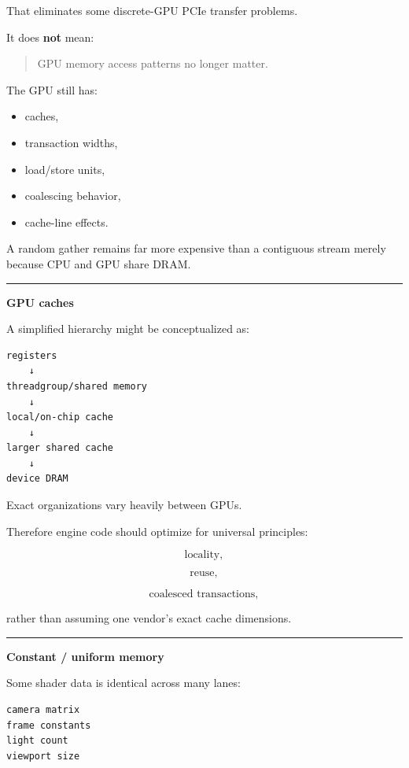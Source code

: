 That eliminates some discrete-GPU PCIe transfer problems.

It does \textbf{not} mean:

\begin{quote}
GPU memory access patterns no longer matter.
\end{quote}

The GPU still has:

\begin{itemize}
\tightlist
\item
  caches,
\item
  transaction widths,
\item
  load/store units,
\item
  coalescing behavior,
\item
  cache-line effects.
\end{itemize}

A random gather remains far more expensive than a contiguous stream merely because CPU and GPU share DRAM.

\begin{center}\rule{0.5\linewidth}{0.5pt}\end{center}

\textbf{GPU caches}

A simplified hierarchy might be conceptualized as:

\protect{}\label{q2nq6h}%
\begin{verbatim}
registers
    ↓
threadgroup/shared memory
    ↓
local/on-chip cache
    ↓
larger shared cache
    ↓
device DRAM
\end{verbatim}

Exact organizations vary heavily between GPUs.

Therefore engine code should optimize for universal principles:

\[
\text{locality},
\]

\[
\text{reuse},
\]

\[
\text{coalesced transactions},
\]

rather than assuming one vendor's exact cache dimensions.

\begin{center}\rule{0.5\linewidth}{0.5pt}\end{center}

\textbf{Constant / uniform memory}

Some shader data is identical across many lanes:

\protect{}\label{xfh30n}%
\begin{verbatim}
camera matrix
frame constants
light count
viewport size
\end{verbatim}

